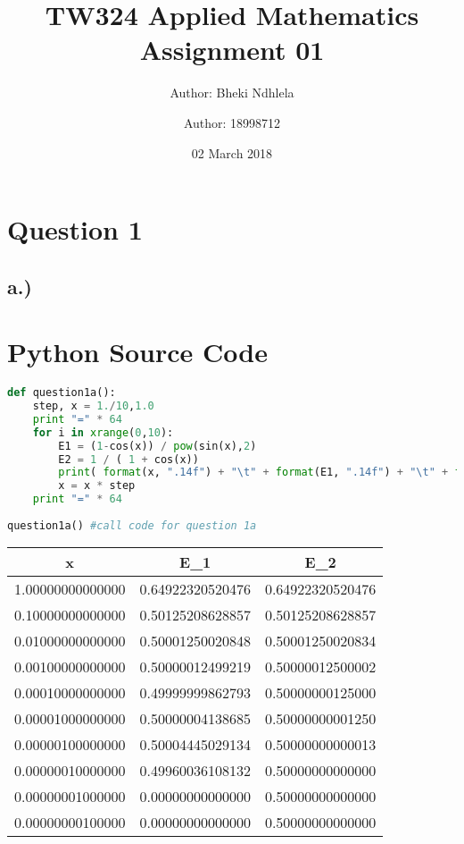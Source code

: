 \documentclass{article}
\title{TW324 Applied Mathematics Assignment 01}
\author{Author: Bheki Ndhlela}
\author{Author: 18998712}
\date{02 March 2018}
\begin{document}
\maketitle

\section*{Question 1}
\subsection*{a.)}
\section*{Python Source Code }
\begin{lstlisting}[language=Python]
def question1a():
    step, x = 1./10,1.0
    print "=" * 64
    for i in xrange(0,10):
        E1 = (1-cos(x)) / pow(sin(x),2)
        E2 = 1 / ( 1 + cos(x))
        print( format(x, ".14f") + "\t" + format(E1, ".14f") + "\t" + format(E2, ".14f"))
        x = x * step
    print "=" * 64
    
question1a() #call code for question 1a
\end{lstlisting}

\begin{center}
    \begin{tabular}{||c c c||} 
    \hline
    x  & E_1 & E_2 \\ [0.5ex] 
    \hline\hline
    1.00000000000000 & 0.64922320520476 & 0.64922320520476  \\ [1ex] 
    \hline
    0.10000000000000 & 0.50125208628857 & 0.50125208628857 \\ [1ex] 
    \hline
    0.01000000000000 & 0.50001250020848 & 0.50001250020834 \\ [1ex] 
    \hline
    0.00100000000000 & 0.50000012499219 & 0.50000012500002 \\ [1ex] 
    \hline
    0.00010000000000 & 0.49999999862793 & 0.50000000125000 \\ [1ex] 
    \hline
    0.00001000000000 & 0.50000004138685 & 0.50000000001250 \\ [1ex] 
    \hline
    0.00000100000000 & 0.50004445029134 & 0.50000000000013 \\ [1ex] 
    \hline
    0.00000010000000 & 0.49960036108132 & 0.50000000000000 \\ [1ex] 
    \hline
    0.00000001000000 & 0.00000000000000 & 0.50000000000000 \\ [1ex] 
    \hline
    0.00000000100000 & 0.00000000000000 & 0.50000000000000 \\ [1ex] 
    \hline
    \end{tabular}
\end{center}
\end{document}

